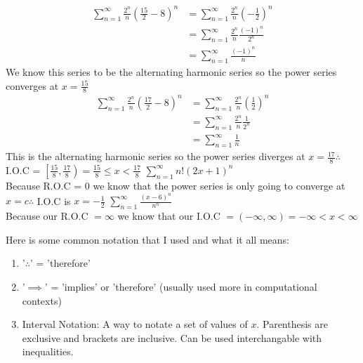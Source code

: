 \documentclass[addpoints]{exam}
\begin{document}
\begin{questions}
    \begin{align*}
    \sum\limits_{n = 1}^\infty  {\frac{{{2^n}}}{n}{{\left( {\frac{{15}}{2} - 8} \right)}^n}} & = \sum\limits_{n = 1}^\infty  {\frac{{{2^n}}}{n}{{\left( { - \frac{1}{2}} \right)}^n}} \\ &  = \sum\limits_{n = 1}^\infty  {\frac{{{2^n}}}{n}\frac{{{{\left( { - 1} \right)}^n}}}{{{2^n}}}} \\ &  = \sum\limits_{n = 1}^\infty  {\frac{{{{\left( { - 1} \right)}^n}}}{n}}
    \end{align*}
    We know this series to be the alternating harmonic series so the power series converges at $x=\frac{15}{8}$
    \begin{align*}\sum\limits_{n = 1}^\infty  {\frac{{{2^n}}}{n}{{\left( {\frac{{17}}{2} - 8} \right)}^n}} & = \sum\limits_{n = 1}^\infty  {\frac{{{2^n}}}{n}{{\left( {\frac{1}{2}} \right)}^n}} \\ &  = \sum\limits_{n = 1}^\infty  {\frac{{{2^n}}}{n}\frac{1}{{{2^n}}}} \\ &  = \sum\limits_{n = 1}^\infty  {\frac{1}{n}} \end{align*}
    This is the alternating harmonic series so the power series diverges at $x=\frac{17}{8} \therefore$ I.O.C = $\left[\frac{15}{8}, \frac{17}{8}\right) = \frac{15}{8} \leq x < \frac{17}{8}$
    \newpage
    \question \(\displaystyle
   \sum\limits_{n = 1}^\infty n\textbf{!}\left(2x+1\right)^{n}
    \) \\
    Because R.O.C = 0 we know that the power series is only going to converge at $x=c \therefore$ I.O.C is $x = -\frac{1}{2}$ 
    \question \(\displaystyle
   \sum\limits_{n = 1}^\infty  {\frac{{{{\left( {x - 6} \right)}^n}}}{{{n^n}}}}
    \) \\
    Because our R.O.C $= \infty$ we know that our I.O.C $= \left(-\infty, \infty\right) = -\infty < x < \infty$
\end{questions}
\begin{tcolorbox}[title=NOTATION,colframe=black,sharp corners,colback=white,colbacktitle=white,coltitle=black]
    Here is some common notation that I used and what it all means:
    \begin{enumerate}
        \item '$\therefore$' = 'therefore'
        \item '$\implies$' = 'implies' or 'therefore' (usually used more in computational contexts)
        \item Interval Notation: A way to notate a set of values of $x$. Parenthesis are exclusive and brackets are inclusive. Can be used interchangable with inequalities. 
    \end{enumerate}
\end{tcolorbox}
\end{document}
